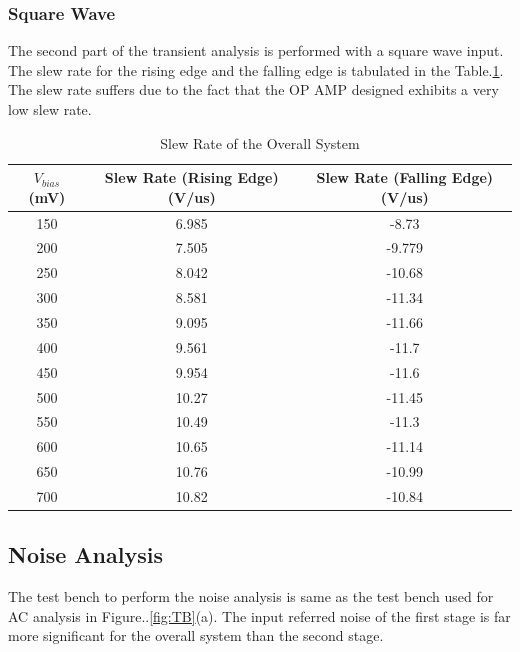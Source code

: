 \subsubsection{Square Wave}
The second part of the transient analysis is performed with a square wave input. 
The slew rate for the rising edge and the falling edge is tabulated in the Table.\ref{tab:SLEW}. The slew rate suffers due to the fact that the OP AMP designed exhibits a very low slew rate.
 
\begin{table} [H]
\centering
\begin{tabular}{@{}ccc@{}}
\toprule
$V_{bias}$ (mV)			& Slew Rate (Rising Edge)(V/us)			& Slew Rate (Falling Edge)(V/us)	 \\ \midrule
150					& 6.985	 					& -8.73					 \\
200					& 7.505 					& -9.779				 \\
250					& 8.042 					& -10.68				 \\
300					& 8.581 					& -11.34				 \\
350					& 9.095						& -11.66				 \\
400					& 9.561						& -11.7					 \\
450					& 9.954 					& -11.6					 \\
500					& 10.27						& -11.45				 \\
550					& 10.49	 					& -11.3					 \\
600					& 10.65 					& -11.14				 \\
650					& 10.76 					& -10.99				 \\
700 				& 10.82 					& -10.84				 \\
\bottomrule
\end{tabular}
\caption{Slew Rate of the Overall System}
\label{tab:SLEW}
\end{table}

\subsection{Noise Analysis}
The test bench to perform the noise analysis is same as the test bench used for AC analysis in Figure..\ref{fig:TB}(a). The input referred noise of the first stage is far more significant for the overall system than the second stage.

